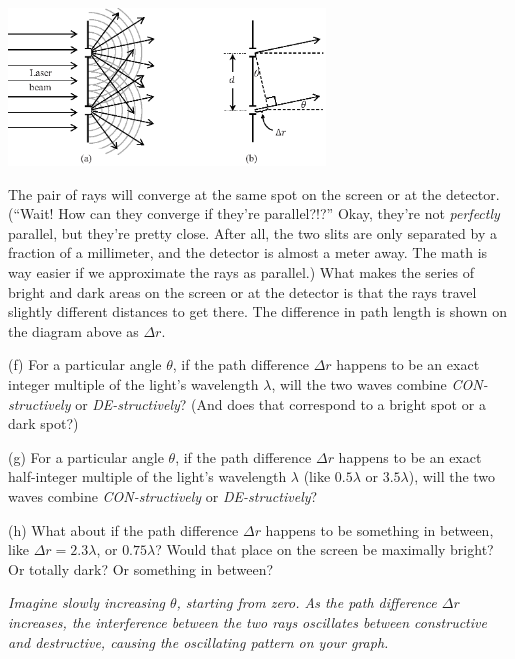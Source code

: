 \vspace{-0.1in}
\begin{center}
\includegraphics[width=0.63\textwidth]{interference_of_light/rays2.eps}
\end{center}
\vspace{-0.2in}

The pair of rays will converge at the same spot on the screen or at the detector.  (``Wait!  How can they converge if they're parallel?!?''  Okay, they're not \textit{perfectly} parallel, but they're pretty close.  After all, the two slits are only separated by a fraction of a millimeter, and the detector is almost a meter away.  The math is way easier if we approximate the rays as parallel.)
What makes the series of bright and dark areas on the screen or at the detector is that the rays travel slightly different distances to get there.  
The difference in path length is shown on the diagram above as $\Delta r$.  

(f) For a particular angle $\theta$, if the path difference $\Delta r$ happens to be an exact integer multiple of the light's wavelength $\lambda$, will the two waves combine \textit{CON-structively} or \textit{DE-structively}?  (And does that correspond to a bright spot or a dark spot?)
\answerspace{0.5in}

(g) For a particular angle $\theta$, if the path difference $\Delta r$ happens to be an exact half-integer multiple of the light's wavelength $\lambda$ (like $0.5\lambda$ or $3.5\lambda$), will the two waves combine \textit{CON-structively} or \textit{DE-structively}?
\answerspace{0.5in}

(h) What about if the path difference $\Delta r$ happens to be something in between, like $\Delta r = 2.3\lambda$, or $0.75\lambda$? Would that place on the screen be maximally bright? Or totally dark? Or something in between?
\answerspace{0.5in}

\textit{Imagine slowly increasing $\theta$, starting from zero.   As the path difference $\Delta r$ increases, the interference between the two rays oscillates between constructive and destructive, causing the oscillating pattern on your graph.}

